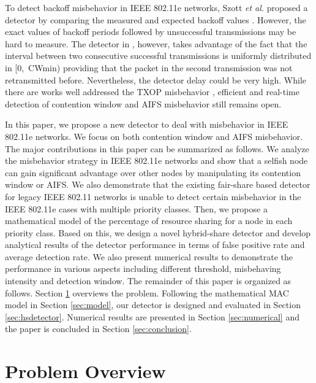 \documentclass[conference]{IEEEtran}
\begin{document}
To detect backoff misbehavior in IEEE 802.11e networks, Szott \emph{et al.} proposed a  detector by comparing the measured and expected backoff values \cite{szott2011detecting}. However, the exact values of backoff periods followed by unsuccessful transmissions may be hard to measure. The detector in \cite{serrano2010detecting}, however, takes advantage of the fact that the interval between two consecutive successful transmissions is uniformly distributed in [0,~CWmin) providing that the packet in the second transmission was not retransmitted before. Nevertheless, the detector delay could be very high. While there are works well addressed the TXOP misbehavior \cite{ahn2011fair}, efficient and real-time detection of contention window and AIFS misbehavior still remains open.

In this paper, we propose a new detector to deal with misbehavior in IEEE 802.11e networks. We focus on both contention window and AIFS misbehavior. The major contributions in this paper can be summarized as follows. We analyze the misbehavior strategy in IEEE 802.11e networks and show that a selfish node can gain significant advantage over other nodes by manipulating its contention window or AIFS. We also demonstrate that the existing fair-share based detector for legacy IEEE 802.11 networks is unable to detect certain misbehavior in the IEEE 802.11e cases with multiple priority classes. Then, we propose a mathematical model of the percentage of resource sharing for a node in each priority class. Based on this, we design a novel hybrid-share detector and develop analytical results of the detector performance in terms of false positive rate and average detection rate. We also present numerical results to demonstrate the performance in various aspects including different threshold, misbehaving intensity and detection window. The remainder of this paper is organized as follows. Section \ref{sec:overview} overviews the problem. Following the mathematical MAC model in Section \ref{sec:model}, our detector is designed and evaluated in Section \ref{sec:hsdetector}. Numerical results are presented in Section \ref{sec:numerical} and the paper is concluded in Section \ref{sec:conclusion}.


\section{Problem Overview} \label{sec:overview}
\end{document}
